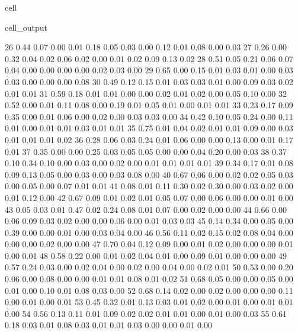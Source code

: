\documentclass[letterpaper,10pt,french]{sphinxmanual}
\begin{document}
\begin{sphinxuseclass}{cell}
\begin{sphinxuseclass}{cell_output}
\begin{sphinxVerbatim}[commandchars=\\\{\}]
        26	0.44 	0.07 	0.00 	0.01 	0.18 	0.05 	0.03 	0.00 	0.12 	0.01 	0.08 	0.00 	0.03
        27	0.26 	0.00 	0.32 	0.04 	0.02 	0.06 	0.02 	0.00 	0.01 	0.02 	0.09 	0.13 	0.02
        28	0.51 	0.05 	0.21 	0.06 	0.07 	0.04 	0.00 	0.00 	0.00 	0.00 	0.02 	0.03 	0.00
        29	0.65 	0.00 	0.15 	0.01 	0.03 	0.01 	0.00 	0.03 	0.03 	0.00 	0.00 	0.00 	0.08
        30	0.49 	0.12 	0.15 	0.01 	0.03 	0.03 	0.01 	0.00 	0.09 	0.03 	0.02 	0.01 	0.01
        31	0.59 	0.18 	0.01 	0.01 	0.00 	0.00 	0.02 	0.01 	0.02 	0.00 	0.05 	0.10 	0.00
        32	0.52 	0.00 	0.01 	0.11 	0.08 	0.00 	0.19 	0.01 	0.05 	0.01 	0.00 	0.01 	0.01
        33	0.23 	0.17 	0.09 	0.35 	0.00 	0.01 	0.06 	0.00 	0.02 	0.00 	0.03 	0.03 	0.00
        34	0.42 	0.10 	0.05 	0.24 	0.00 	0.11 	0.01 	0.00 	0.01 	0.01 	0.03 	0.01 	0.01
        35	0.75 	0.01 	0.04 	0.02 	0.01 	0.01 	0.09 	0.00 	0.03 	0.01 	0.01 	0.01 	0.02
        36	0.28 	0.06 	0.03 	0.24 	0.01 	0.06 	0.00 	0.00 	0.13 	0.00 	0.01 	0.17 	0.01
        37	0.35 	0.00 	0.00 	0.25 	0.03 	0.05 	0.05 	0.00 	0.00 	0.04 	0.20 	0.00 	0.03
        38	0.37 	0.10 	0.34 	0.10 	0.00 	0.03 	0.00 	0.02 	0.00 	0.01 	0.01 	0.01 	0.01
        39	0.34 	0.17 	0.01 	0.08 	0.09 	0.13 	0.05 	0.00 	0.03 	0.00 	0.03 	0.08 	0.00
        40	0.67 	0.06 	0.00 	0.02 	0.02 	0.05 	0.03 	0.00 	0.05 	0.00 	0.07 	0.01 	0.01
        41	0.08 	0.01 	0.11 	0.30 	0.02 	0.30 	0.00 	0.03 	0.02 	0.00 	0.01 	0.12 	0.00
        42	0.67 	0.09 	0.01 	0.02 	0.01 	0.05 	0.07 	0.00 	0.06 	0.00 	0.00 	0.01 	0.00
        43	0.05 	0.03 	0.01 	0.47 	0.02 	0.24 	0.08 	0.01 	0.07 	0.00 	0.02 	0.00 	0.00
        44	0.66 	0.00 	0.06 	0.09 	0.03 	0.02 	0.00 	0.00 	0.06 	0.00 	0.01 	0.03 	0.03
        45	0.14 	0.34 	0.00 	0.05 	0.00 	0.39 	0.00 	0.00 	0.01 	0.00 	0.03 	0.04 	0.00
        46	0.56 	0.11 	0.02 	0.15 	0.02 	0.08 	0.04 	0.00 	0.00 	0.00 	0.02 	0.00 	0.00
        47	0.70 	0.04 	0.12 	0.09 	0.00 	0.01 	0.02 	0.00 	0.00 	0.00 	0.01 	0.00 	0.01
        48	0.58 	0.22 	0.00 	0.01 	0.02 	0.04 	0.01 	0.00 	0.09 	0.01 	0.00 	0.00 	0.00
        49	0.57 	0.24 	0.03 	0.00 	0.02 	0.04 	0.00 	0.02 	0.00 	0.04 	0.00 	0.02 	0.01
        50	0.53 	0.00 	0.20 	0.06 	0.00 	0.08 	0.00 	0.00 	0.01 	0.01 	0.08 	0.01 	0.02
        51	0.68 	0.05 	0.00 	0.00 	0.05 	0.00 	0.01 	0.00 	0.10 	0.01 	0.08 	0.03 	0.00
        52	0.68 	0.14 	0.02 	0.00 	0.02 	0.00 	0.00 	0.00 	0.11 	0.00 	0.01 	0.00 	0.01
        53	0.45 	0.32 	0.01 	0.13 	0.03 	0.01 	0.02 	0.00 	0.01 	0.00 	0.01 	0.01 	0.00
        54	0.56 	0.13 	0.11 	0.01 	0.09 	0.02 	0.02 	0.01 	0.01 	0.00 	0.01 	0.00 	0.03
        55	0.61 	0.18 	0.03 	0.01 	0.08 	0.03 	0.01 	0.01 	0.03 	0.00 	0.00 	0.01 	0.00

\end{sphinxVerbatim}
\end{sphinxuseclass}
\end{sphinxuseclass}
\end{document}
